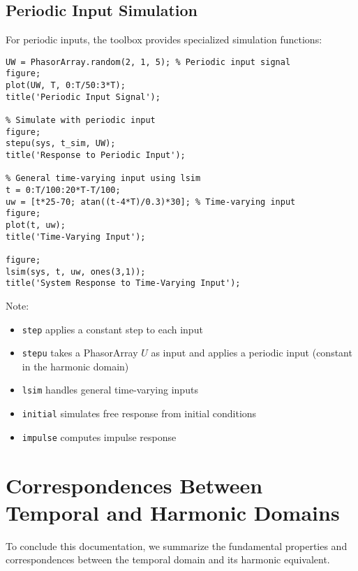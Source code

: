 \documentclass[11pt,a4paper]{article}
\begin{document}
\subsection{Periodic Input Simulation}

For periodic inputs, the toolbox provides specialized simulation functions:

\begin{lstlisting}[style=matlabstyle]
% Periodic step input (constant in harmonic domain)
UW = PhasorArray.random(2, 1, 5); % Periodic input signal
figure;
plot(UW, T, 0:T/50:3*T);
title('Periodic Input Signal');

% Simulate with periodic input
figure;
stepu(sys, t_sim, UW);
title('Response to Periodic Input');

% General time-varying input using lsim
t = 0:T/100:20*T-T/100;
uw = [t*25-70; atan((t-4*T)/0.3)*30]; % Time-varying input
figure;
plot(t, uw);
title('Time-Varying Input');

figure;
lsim(sys, t, uw, ones(3,1));
title('System Response to Time-Varying Input');
\end{lstlisting}

Note:
\begin{itemize}
    \item \texttt{step} applies a constant step to each input
    \item \texttt{stepu} takes a PhasorArray $U$ as input and applies a periodic input (constant in the harmonic domain)
    \item \texttt{lsim} handles general time-varying inputs
    \item \texttt{initial} simulates free response from initial conditions
    \item \texttt{impulse} computes impulse response
\end{itemize}

\section{Correspondences Between Temporal and Harmonic Domains}

To conclude this documentation, we summarize the fundamental properties and correspondences between the temporal domain and its harmonic equivalent.
\end{document}
